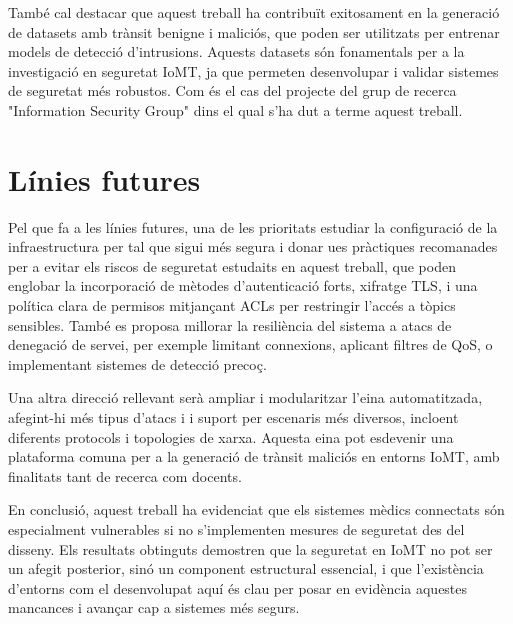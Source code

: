 També cal destacar que aquest treball ha contribuït exitosament en la generació de datasets amb trànsit benigne i maliciós, que poden ser utilitzats per entrenar models de detecció d’intrusions. Aquests datasets són fonamentals per a la investigació en seguretat IoMT, ja que permeten desenvolupar i validar sistemes de seguretat més robustos. Com és el cas del projecte del grup de recerca "Information Security Group" dins el qual s'ha dut a terme aquest treball.

\section{Línies futures}

Pel que fa a les línies futures, una de les prioritats estudiar la configuració de la infraestructura per tal que sigui més segura i donar ues pràctiques recomanades per a evitar els riscos de seguretat estudaits en aquest treball, que poden englobar la incorporació de mètodes d’autenticació forts, xifratge TLS, i una política clara de permisos mitjançant ACLs per restringir l’accés a tòpics sensibles. També es proposa millorar la resiliència del sistema a atacs de denegació de servei, per exemple limitant connexions, aplicant filtres de QoS, o implementant sistemes de detecció precoç.

Una altra direcció rellevant serà ampliar i modularitzar l’eina automatitzada, afegint-hi més tipus d’atacs i i suport per escenaris més diversos, incloent diferents protocols i topologies de xarxa. Aquesta eina pot esdevenir una plataforma comuna per a la generació de trànsit maliciós en entorns IoMT, amb finalitats tant de recerca com docents.

En conclusió, aquest treball ha evidenciat que els sistemes mèdics connectats són especialment vulnerables si no s’implementen mesures de seguretat des del disseny. Els resultats obtinguts demostren que la seguretat en IoMT no pot ser un afegit posterior, sinó un component estructural essencial, i que l’existència d’entorns com el desenvolupat aquí és clau per posar en evidència aquestes mancances i avançar cap a sistemes més segurs.